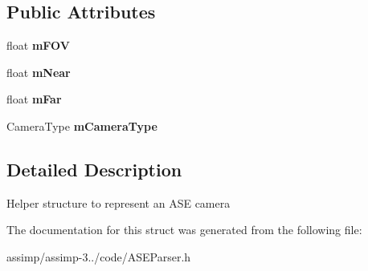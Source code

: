 \subsection*{Public Attributes}
\begin{DoxyCompactItemize}
\item 
\hypertarget{struct_assimp_1_1_a_s_e_1_1_camera_a5a1a3704810024418ec43cde064eb0b1}{float {\bfseries m\+F\+O\+V}}\label{struct_assimp_1_1_a_s_e_1_1_camera_a5a1a3704810024418ec43cde064eb0b1}

\item 
\hypertarget{struct_assimp_1_1_a_s_e_1_1_camera_a6e3ff1d3cdd26f66cea0f19632b2450d}{float {\bfseries m\+Near}}\label{struct_assimp_1_1_a_s_e_1_1_camera_a6e3ff1d3cdd26f66cea0f19632b2450d}

\item 
\hypertarget{struct_assimp_1_1_a_s_e_1_1_camera_a8e0a4d9e22311e0fd2a81e29e8587cc6}{float {\bfseries m\+Far}}\label{struct_assimp_1_1_a_s_e_1_1_camera_a8e0a4d9e22311e0fd2a81e29e8587cc6}

\item 
\hypertarget{struct_assimp_1_1_a_s_e_1_1_camera_adcf3d6d068a29a2f4307e0e6797cdcda}{Camera\+Type {\bfseries m\+Camera\+Type}}\label{struct_assimp_1_1_a_s_e_1_1_camera_adcf3d6d068a29a2f4307e0e6797cdcda}

\end{DoxyCompactItemize}


\subsection{Detailed Description}
Helper structure to represent an A\+S\+E camera 

The documentation for this struct was generated from the following file\+:\begin{DoxyCompactItemize}
\item 
assimp/assimp-\/3../code/A\+S\+E\+Parser.\+h\end{DoxyCompactItemize}
